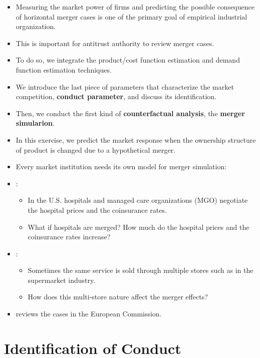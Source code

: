 \documentclass[
]{book}
\providecommand{\tightlist}{%
  \setlength{\itemsep}{0pt}\setlength{\parskip}{0pt}}
\begin{document}
\begin{itemize}
\tightlist
\item
  Measuring the market power of firms and predicting the possible consequence of horizontal merger cases is one of the primary goal of empirical industrial organization.
\item
  This is important for antitrust authority to review merger cases.
\item
  To do so, we integrate the product/cost function estimation and demand function estimation techniques.
\item
  We introduce the last piece of parameters that characterize the market competition, \textbf{conduct parameter}, and discuss its identification.
\item
  Then, we conduct the first kind of \textbf{counterfactual analysis}, the \textbf{merger simularion}.
\item
  In this exercise, we predict the market response when the ownership structure of product is changed due to a hypothetical merger.
\item
  Every market institution needs its own model for merger simulation:
\item
  \citet{Gowrisankaran2015}:

  \begin{itemize}
  \tightlist
  \item
    In the U.S. hospitals and managed care organizations (MGO) negotiate the hospital prices and the coinsurance rates.
  \item
    What if hospitals are merged? How much do the hospital prices and the coinsurance rates increase?
  \end{itemize}
\item
  \citet{Smith2004}:

  \begin{itemize}
  \tightlist
  \item
    Sometimes the same service is sold through multiple stores such as in the supermarket industry.
  \item
    How does this multi-store nature affect the merger effects?
  \end{itemize}
\item
  \citet{Ivaldi2005} reviews the cases in the European Commission.
\end{itemize}

\hypertarget{identification-of-conduct}{%
\section{Identification of Conduct}\label{identification-of-conduct}}
\end{document}
